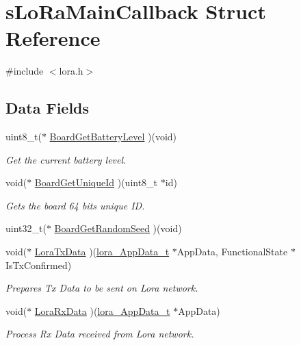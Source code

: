 \hypertarget{structsLoRaMainCallback}{}\section{s\+Lo\+Ra\+Main\+Callback Struct Reference}
\label{structsLoRaMainCallback}


{\ttfamily \#include $<$lora.\+h$>$}

\subsection*{Data Fields}
\begin{DoxyCompactItemize}
\item 
uint8\+\_\+t($\ast$ \hyperlink{structsLoRaMainCallback_a10356b5b7ec7c4f7f7f353ce60303228}{Board\+Get\+Battery\+Level} )(void)
\begin{DoxyCompactList}\small\item\em Get the current battery level. \end{DoxyCompactList}\item 
void($\ast$ \hyperlink{structsLoRaMainCallback_a38908382e21d45d19fc62819392d9e4e}{Board\+Get\+Unique\+Id} )(uint8\+\_\+t $\ast$id)
\begin{DoxyCompactList}\small\item\em Gets the board 64 bits unique ID. \end{DoxyCompactList}\item 
uint32\+\_\+t($\ast$ \hyperlink{structsLoRaMainCallback_a3af93bea58be398fec39de2b8d20cadf}{Board\+Get\+Random\+Seed} )(void)
\item 
void($\ast$ \hyperlink{structsLoRaMainCallback_a17716374e3807a581cd87b9cb6af087b}{Lora\+Tx\+Data} )(\hyperlink{structlora__AppData__t}{lora\+\_\+\+App\+Data\+\_\+t} $\ast$App\+Data, Functional\+State $\ast$Is\+Tx\+Confirmed)
\begin{DoxyCompactList}\small\item\em Prepares Tx Data to be sent on Lora network. \end{DoxyCompactList}\item 
void($\ast$ \hyperlink{structsLoRaMainCallback_a9a0d4a78b97ba11f22fcfea6fb3c3667}{Lora\+Rx\+Data} )(\hyperlink{structlora__AppData__t}{lora\+\_\+\+App\+Data\+\_\+t} $\ast$App\+Data)
\begin{DoxyCompactList}\small\item\em Process Rx Data received from Lora network. \end{DoxyCompactList}\end{DoxyCompactItemize}


